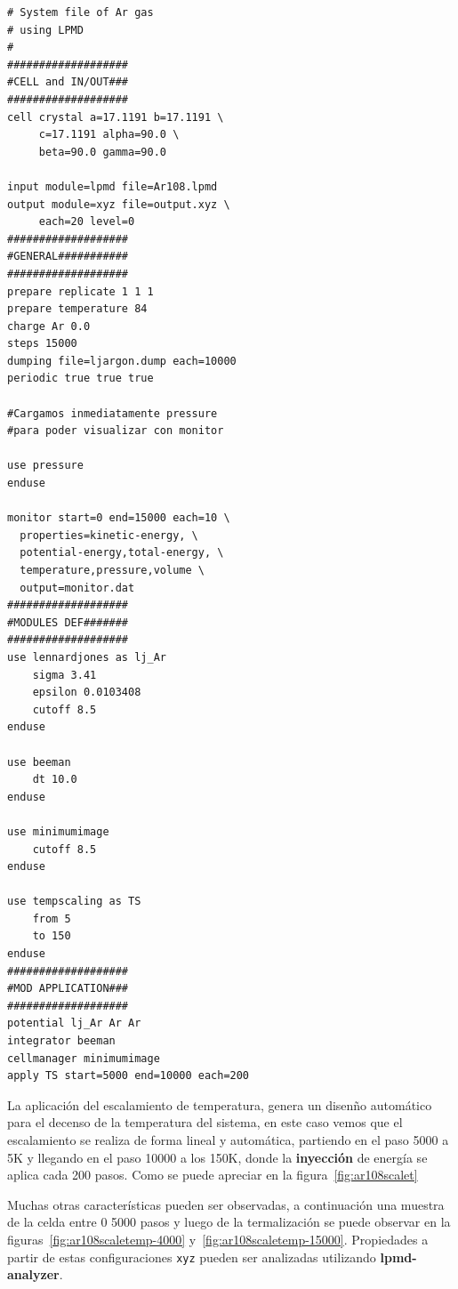 \begin{multicols}{2}
\setlength{\columnseprule}{.5pt}
\begin{verbatim}
# System file of Ar gas 
# using LPMD
#
###################
#CELL and IN/OUT###
###################
cell crystal a=17.1191 b=17.1191 \
     c=17.1191 alpha=90.0 \
     beta=90.0 gamma=90.0

input module=lpmd file=Ar108.lpmd
output module=xyz file=output.xyz \
     each=20 level=0
###################
#GENERAL###########
###################
prepare replicate 1 1 1
prepare temperature 84
charge Ar 0.0
steps 15000
dumping file=ljargon.dump each=10000
periodic true true true

#Cargamos inmediatamente pressure
#para poder visualizar con monitor

use pressure
enduse

monitor start=0 end=15000 each=10 \
  properties=kinetic-energy, \
  potential-energy,total-energy, \
  temperature,pressure,volume \
  output=monitor.dat
###################
#MODULES DEF#######
###################
use lennardjones as lj_Ar
    sigma 3.41
    epsilon 0.0103408
    cutoff 8.5
enduse

use beeman
    dt 10.0
enduse

use minimumimage
    cutoff 8.5
enduse

use tempscaling as TS
    from 5
    to 150
enduse
###################
#MOD APPLICATION###
###################
potential lj_Ar Ar Ar
integrator beeman
cellmanager minimumimage
apply TS start=5000 end=10000 each=200
\end{verbatim}
\end{multicols}

La aplicaci\'on del escalamiento de temperatura, genera un disen\~no autom\'atico para el decenso de la temperatura del sistema, en este caso vemos que el escalamiento se realiza de forma lineal y autom\'atica, partiendo en el paso 5000 a 5K y llegando en el paso 10000 a los 150K, donde la \textbf{inyecci\'on} de energ\'ia se aplica cada 200 pasos. Como se puede apreciar en la figura~\ref{fig:ar108scalet}


Muchas otras caracter\'isticas pueden ser observadas, a continuaci\'on una muestra de la celda entre 0 5000 pasos y luego de la termalizaci\'on se puede observar en la figuras~\ref{fig:ar108scaletemp-4000} y~\ref{fig:ar108scaletemp-15000}. Propiedades a partir de estas configuraciones \verb|xyz| pueden ser analizadas utilizando \textbf{lpmd-analyzer}.

